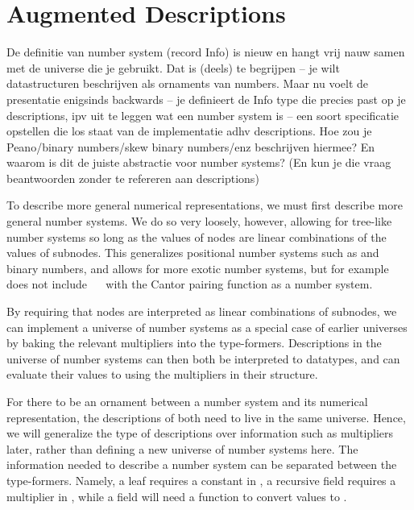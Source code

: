 \section{Augmented Descriptions}
\begin{outline}
    De definitie van number system (record Info) is nieuw en hangt vrij
   nauw samen met de universe die je gebruikt. Dat is (deels) te
   begrijpen -- je wilt datastructuren beschrijven als ornaments van
   numbers. Maar nu voelt de presentatie enigsinds backwards -- je
   definieert de Info type die precies past op je descriptions, ipv uit
   te leggen wat een number system is -- een soort specificatie
   opstellen die los staat van de implementatie adhv descriptions. Hoe
   zou je Peano/binary numbers/skew binary numbers/enz beschrijven
   hiermee? En waarom is dit de juiste abstractie voor number systems?
   (En kun je die vraag beantwoorden zonder te refereren aan
   descriptions)
\end{outline}

To describe more general numerical representations, we must first describe more general number systems. We do so very loosely, however, allowing for tree-like number systems so long as the values of nodes are linear combinations of the values of subnodes. This generalizes positional number systems such as \bN{} and binary numbers, and allows for more exotic number systems, but for example does not include \bN{}\ \ \bN{} with the Cantor pairing function as a number system.

By requiring that nodes are interpreted as linear combinations of subnodes, we can implement a universe of number systems as a special case of earlier universes by baking the relevant multipliers into the type-formers. Descriptions in the universe of number systems can then both be interpreted to datatypes, and can evaluate their values to \bN{} using the multipliers in their structure.

For there to be an ornament between a number system and its numerical representation, the descriptions of both need to live in the same universe. Hence, we will generalize the type of descriptions over information such as multipliers later, rather than defining a new universe of number systems here. The information needed to describe a number system can be separated between the type-formers. Namely, a leaf  requires a constant in \bN{}, a recursive field  requires a multiplier in \bN{}, while a field  will need a function to convert values to \bN{}.

